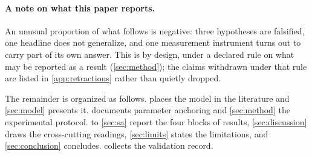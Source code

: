 \paragraph{A note on what this paper reports.}
An unusual proportion of what follows is negative: three hypotheses are falsified, one headline does not generalize, and one measurement instrument turns out to carry part of its own answer. This is by design, under a declared rule on what may be reported as a result (\cref{sec:method}); the claims withdrawn under that rule are listed in \cref{app:retractions} rather than quietly dropped.

The remainder is organized as follows.
 places the model in the literature and \cref{sec:model} presents it.  documents parameter anchoring and \cref{sec:method} the experimental protocol.
 to \cref{sec:sa} report the four blocks of results, \cref{sec:discussion} draws the cross-cutting readings, \cref{sec:limits}
states the limitations, and \cref{sec:conclusion} concludes.
 collects the validation record.
